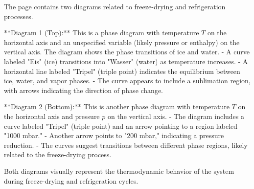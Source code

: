 The page contains two diagrams related to freeze-drying and refrigeration processes.  

**Diagram 1 (Top):**  
This is a phase diagram with temperature \( T \) on the horizontal axis and an unspecified variable (likely pressure or enthalpy) on the vertical axis. The diagram shows the phase transitions of ice and water.  
- A curve labeled "Eis" (ice) transitions into "Wasser" (water) as temperature increases.  
- A horizontal line labeled "Tripel" (triple point) indicates the equilibrium between ice, water, and vapor phases.  
- The curve appears to include a sublimation region, with arrows indicating the direction of phase change.  

**Diagram 2 (Bottom):**  
This is another phase diagram with temperature \( T \) on the horizontal axis and pressure \( p \) on the vertical axis.  
- The diagram includes a curve labeled "Tripel" (triple point) and an arrow pointing to a region labeled "1000 mbar."  
- Another arrow points to "200 mbar," indicating a pressure reduction.  
- The curves suggest transitions between different phase regions, likely related to the freeze-drying process.  

Both diagrams visually represent the thermodynamic behavior of the system during freeze-drying and refrigeration cycles.